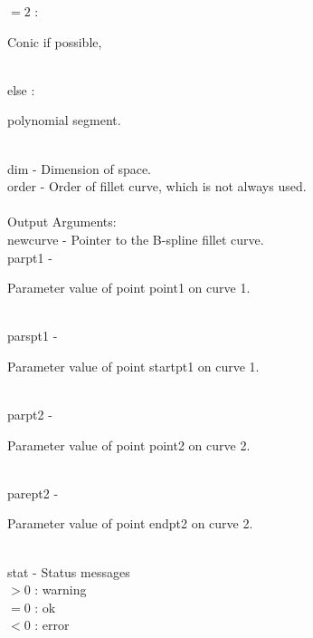                 \>\>\>\>\>      $=2$ : \>\begin{minipg5}
                                Conic if possible,
                                \end{minipg5}\\
                \>\>\>\>\>      else : \>\begin{minipg5}
                                polynomial segment.
                                \end{minipg5}\\
        \>\>    {\fov dim}      \> - \> Dimension of space.\\
        \>\>    {\fov order}    \> - \> Order of fillet curve, which is not always used.\\
\\
        \>Output Arguments:\\
        \>\>    {\fov newcurve}\> - \> Pointer to the B-spline fillet curve.\\
        \>\>    {\fov parpt1}   \> - \> \begin{minipg2}
                        Parameter value of point {\fov point1} on curve 1.
                                \end{minipg2}\\
        \>\>    {\fov parspt1}  \> - \> \begin{minipg2}
                        Parameter value of point {\fov startpt1} on curve 1.
                                \end{minipg2}\\
        \>\>    {\fov parpt2}   \> - \> \begin{minipg2}
                        Parameter value of point {\fov point2} on curve 2.
                                \end{minipg2}\\
        \>\>    {\fov parept2}  \> - \> \begin{minipg2}
                        Parameter value of point {\fov endpt2} on curve 2.
                                \end{minipg2}\\
        \>\>    {\fov stat}     \> - \> Status messages\\
                \>\>\>\>\>              $> 0$   : warning\\
                \>\>\>\>\>              $= 0$   : ok\\
                \>\>\>\>\>              $< 0$   : error\\
